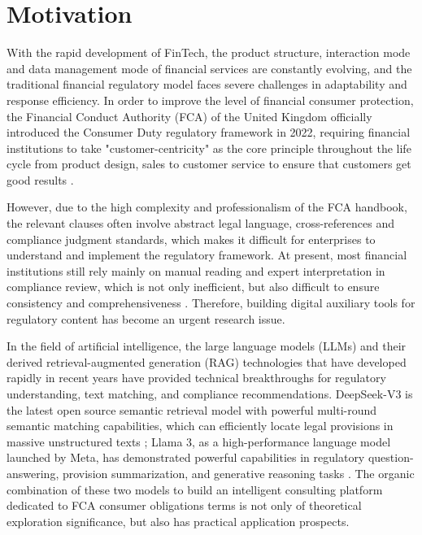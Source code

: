 \documentclass[a4paper,11pt]{article}
\begin{document}
\section{Motivation}

With the rapid development of FinTech, the product structure, interaction mode and data management mode of financial services are constantly evolving, and the traditional financial regulatory model faces severe challenges in adaptability and response efficiency. In order to improve the level of financial consumer protection, the Financial Conduct Authority (FCA) of the United Kingdom officially introduced the Consumer Duty regulatory framework in 2022, requiring financial institutions to take "customer-centricity" as the core principle throughout the life cycle from product design, sales to customer service to ensure that customers get good results \cite{fca2022consumerduty}.

However, due to the high complexity and professionalism of the FCA handbook, the relevant clauses often involve abstract legal language, cross-references and compliance judgment standards, which makes it difficult for enterprises to understand and implement the regulatory framework. At present, most financial institutions still rely mainly on manual reading and expert interpretation in compliance review, which is not only inefficient, but also difficult to ensure consistency and comprehensiveness \cite{breden2020ai}. Therefore, building digital auxiliary tools for regulatory content has become an urgent research issue.

In the field of artificial intelligence, the large language models (LLMs) and their derived retrieval-augmented generation (RAG) technologies that have developed rapidly in recent years have provided technical breakthroughs for regulatory understanding, text matching, and compliance recommendations. DeepSeek-V3 is the latest open source semantic retrieval model with powerful multi-round semantic matching capabilities, which can efficiently locate legal provisions in massive unstructured texts \cite{deepseek2023}; Llama 3, as a high-performance language model launched by Meta, has demonstrated powerful capabilities in regulatory question-answering, provision summarization, and generative reasoning tasks \cite{meta2024llama3}. The organic combination of these two models to build an intelligent consulting platform dedicated to FCA consumer obligations terms is not only of theoretical exploration significance, but also has practical application prospects.
\end{document}
